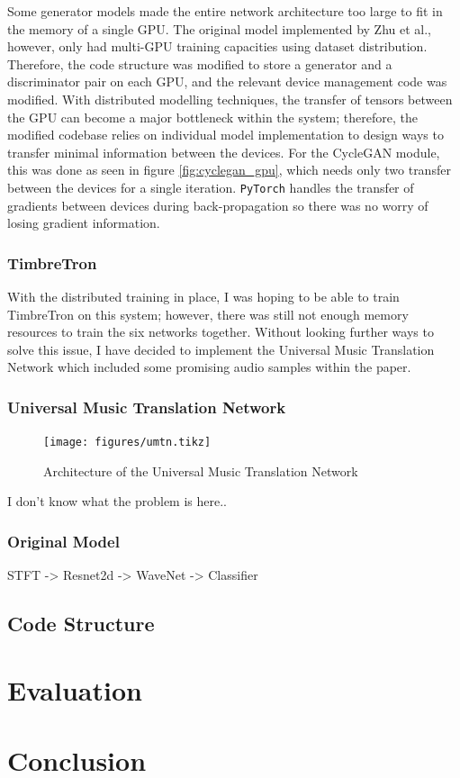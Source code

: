 \documentclass[]{report}
\begin{document}
Some generator models made the entire network architecture too large to
fit in the memory of a single GPU. The original model implemented by Zhu
et al., however, only had multi-GPU training capacities using dataset
distribution. Therefore, the code structure was modified to store a
generator and a discriminator pair on each GPU, and the relevant device
management code was modified. With distributed modelling techniques, the
transfer of tensors between the GPU can become a major bottleneck within
the system; therefore, the modified codebase relies on individual model
implementation to design ways to transfer minimal information between
the devices. For the CycleGAN module, this was done as seen in figure
\ref{fig:cyclegan_gpu}, which needs only two transfer between the
devices for a single iteration. \texttt{PyTorch} handles the transfer of
gradients between devices during back-propagation so there was no worry
of losing gradient information.

\hypertarget{timbretron-1}{%
\subsection{TimbreTron}\label{timbretron-1}}

With the distributed training in place, I was hoping to be able to train
TimbreTron on this system; however, there was still not enough memory
resources to train the six networks together. Without looking further
ways to solve this issue, I have decided to implement the Universal
Music Translation Network which included some promising audio samples
within the paper.

\hypertarget{universal-music-translation-network-1}{%
\subsection{Universal Music Translation
Network}\label{universal-music-translation-network-1}}

\begin{figure}[h]
    \texttt{[image: figures/umtn.tikz]}
\centering 
\caption{Architecture of the Universal Music Translation Network \label{fig:umtn}}
\end{figure}

I don't know what the problem is here..

\hypertarget{original-model}{%
\subsection{Original Model}\label{original-model}}

STFT -\textgreater{} Resnet2d -\textgreater{} WaveNet -\textgreater{}
Classifier

\hypertarget{code-structure}{%
\section{Code Structure}\label{code-structure}}

\hypertarget{evaluation}{%
\chapter{Evaluation}\label{evaluation}}

\hypertarget{conclusion}{%
\chapter{Conclusion}\label{conclusion}}
\end{document}
